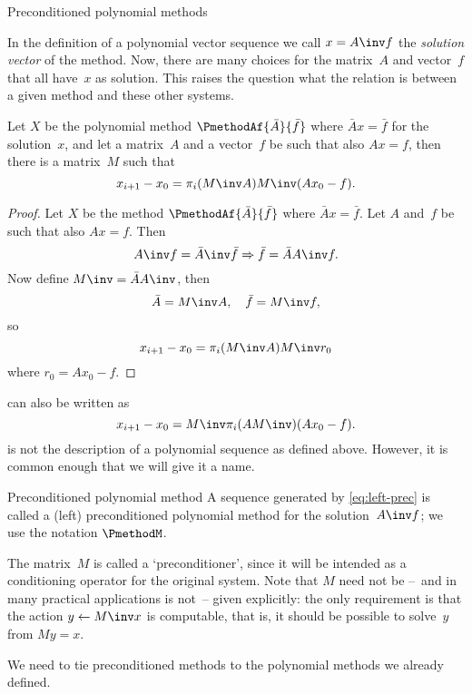  {Preconditioned polynomial methods}

In the definition of a polynomial vector sequence we call $x=A\inv f$
the {\it solution vector} of the method. Now, there are many choices
for the matrix~$A$ and vector~$f$ that all have~$x$ as solution. This
raises the question what the relation is between a given method and
these other systems.

\begin{precond}
\begin{lemma}
Let $X$ be the polynomial method 
$\PmethodAf{\bar A}{\bar f}$ where $\bar A x=\bar f$
for the solution~$x$, and let a matrix~$A$ and a
vector~$f$ be such that also $Ax=f$, then there is a matrix~$M$
such that
\begin{equation} 
 x_{i+1}-x_0=\pi_i(M\inv A)M\inv (Ax_0-f)
        \label{eq:left-prec}.\end{equation}
\end{lemma}
\begin{proof}
Let $X$ be the method 
$\PmethodAf{\bar A}{\bar f}$ where $\bar Ax=\bar f$.
Let $A$ and~$f$ be such that also $Ax=f$. Then
\[ A\inv f=\bar A\inv \bar f\Rightarrow \bar f=\bar AA\inv f. \]
Now define $M\inv=\bar AA\inv$, then
\[ \bar A=M\inv A,\quad \bar f=M\inv f,\]
so 
\[ x_{i+1}-x_0=\pi_i(M\inv A)M\inv r_0 \]
where $r_0=Ax_0-f$.
\end{proof}

 can also be written as
\[ x_{i+1}-x_0= M\inv\pi_i(AM\inv)(Ax_0-f). \]
 is not the description of a polynomial sequence
as defined above. However, it is common enough that we will give it a
name.

\begin{ddefinition}{Preconditioned polynomial method}
A sequence generated by \eqref{eq:left-prec} is called a (left)
preconditioned polynomial method for the solution~$A\inv f$; we use
the notation $\PmethodM$.
\end{ddefinition}

The matrix~$M$ is called a `preconditioner',
since it will be intended as a conditioning operator for the original
system. Note that $M$ need not be --~and in many practical applications
is not~-- given explicitly: the only
requirement is that the action $y\leftarrow M\inv x$ is computable, that is,
it should be possible to solve~$y$ from $My=x$.

We need to tie preconditioned methods to the polynomial methods we
already defined.


\end{precond}
